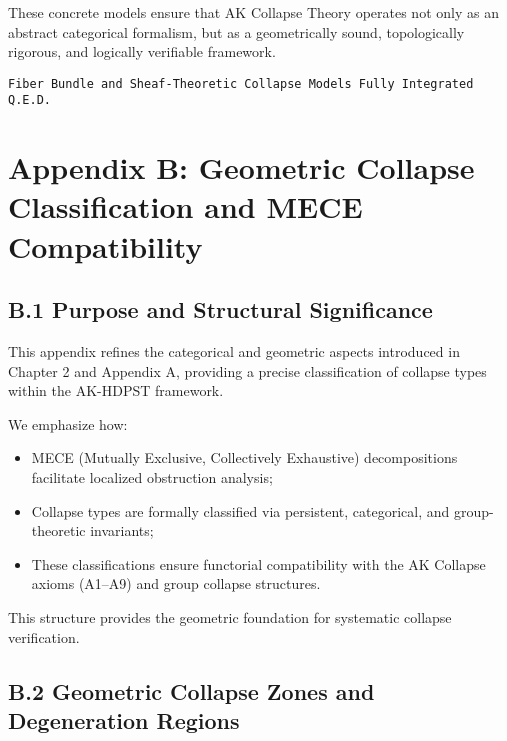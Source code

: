 \documentclass[11pt]{article}
\begin{document}
These concrete models ensure that AK Collapse Theory operates not only as an abstract categorical formalism, but as a geometrically sound, topologically rigorous, and logically verifiable framework.

\begin{flushright}
\texttt{Fiber Bundle and Sheaf-Theoretic Collapse Models \quad Fully Integrated \quad Q.E.D.}
\end{flushright}



\section*{Appendix B: Geometric Collapse Classification and MECE Compatibility}

\subsection*{B.1 Purpose and Structural Significance}

This appendix refines the categorical and geometric aspects introduced in Chapter 2 and Appendix A, providing a precise classification of collapse types within the AK-HDPST framework.

We emphasize how:

\begin{itemize}
    \item MECE (Mutually Exclusive, Collectively Exhaustive) decompositions facilitate localized obstruction analysis;
    \item Collapse types are formally classified via persistent, categorical, and group-theoretic invariants;
    \item These classifications ensure functorial compatibility with the AK Collapse axioms (A1–A9) and group collapse structures.
\end{itemize}

This structure provides the geometric foundation for systematic collapse verification.

\subsection*{B.2 Geometric Collapse Zones and Degeneration Regions}
\end{document}
